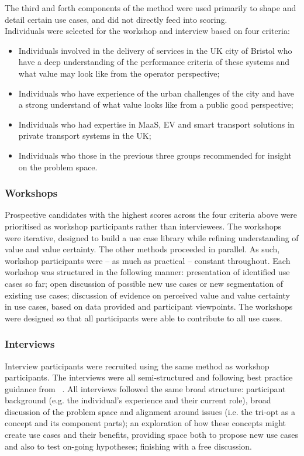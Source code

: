 \documentclass[b5paper,10pt]{article}
\begin{document}
The third and forth components of the method were used primarily to
shape and detail certain use cases, and did not directly feed into
scoring.\\

Individuals were selected for the workshop and interview based on four
criteria: 

\begin{itemize}
\item Individuals involved in the delivery of services in
the UK city of Bristol who have a deep understanding of
the performance criteria of these systems and what value may look like
from the operator perspective;
\item Individuals who have experience of the urban challenges of the
city and have a strong understand of what value looks like from a
public good perspective;
\item Individuals who had expertise in MaaS, EV and smart
transport solutions in private transport systems in the UK;
\item Individuals who those in the previous three groups recommended for
insight on the problem space.
\end{itemize}

\subsubsection{Workshops}

Prospective candidates with the highest scores across the four
criteria above were prioritised as workshop participants rather than
interviewees. The workshops were iterative, designed to build a use
case library while refining understanding of value and value
certainty. The other methods proceeded in parallel. As such, workshop
participants were -- as much as practical -- constant throughout.
Each workshop was structured in the following manner: presentation of
identified use cases so far; open discussion of possible new use cases
or new segmentation of existing use cases; discussion of evidence on
perceived value and value certainty in use cases, based on data
provided and participant viewpoints. The workshops were designed so
that all participants were able to contribute to all use cases.

\subsubsection{Interviews}

Interview participants were recruited using the same method as
workshop participants. The interviews were all semi-structured and
following best practice guidance from ~\citet{king+horrocks:2010}. All
interviews followed the same broad structure: participant background
(e.g. the individual's experience and their current role), broad
discussion of the problem space and alignment around issues (i.e. the
tri-opt as a concept and its component parts); an exploration of how
these concepts might create use cases and their benefits, providing
space both to propose new use cases and also to test on-going
hypotheses; finishing with a free discussion.
\end{document}
